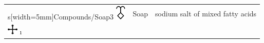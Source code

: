 \documentclass[british,final,landscape]{scrartcl}
\begin{document}
\begin{refsection}
\begin{supertabular}{p{0.3\textwidth}p{0.34\textwidth}p{0.34\textwidth}}
s[width=5mm]{Compounds/Soap3} \includegraphics[width=5mm]{Compounds/Soap4} & Soap & sodium salt of mixed fatty acids\\
   \includegraphics[width=5mm]{Compounds/Sublimate}   \i
\end{supertabular}
\end{refsection}
\end{document}
